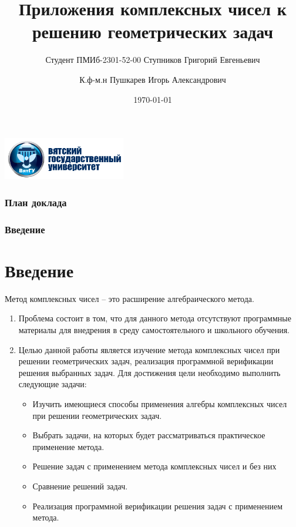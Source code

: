\documentclass{beamer}
\title[]{Приложения комплексных чисел к решению геометрических задач}
\institute[]{ФГБОУ ВО «Вятский государственный университет»}
\date{\today}
\author[ ]{Студент ПМИб-2301-52-00 Ступников Григорий Евгеньевич \and К.ф-м.н Пушкарев Игорь Александрович}
\newcommand\frametitleSpec[1]{%
\frametitle{#1}
\section{#1}%
}
\begin{document}
\begin{frame}
   \centering\includegraphics[width=0.4\textwidth]{images/vyatsu_logo.png}\\
   \titlepage
\end{frame}
\begin{frame}
   \frametitle{План доклада}

   \tableofcontents

\end{frame}
\begin{frame}
   \frametitleSpec{Введение}
   Метод комплексных чисел -- это расширение алгебраического метода.
   \begin{enumerate}
      \item Проблема состоит в том, что для данного метода отсутствуют программные материалы для внедрения в среду самостоятельного и школьного обучения.
      \item Целью данной работы является изучение метода комплексных чисел при решении геометрических задач, реализация программной верификации решения выбранных задач. Для достижения цели необходимо выполнить следующие задачи:
            \begin{itemize}
               \item Изучить имеющиеся способы применения алгебры комплексных чисел при решении геометрических задач.
               \item Выбрать задачи, на которых будет рассматриваться практическое применение метода.
               \item Решение задач с применением метода комплексных чисел и без них
               \item Сравнение решений задач.
               \item Реализация программной верификации решения задач с применением метода.
            \end{itemize}
   \end{enumerate}
\end{frame}
\end{document}
